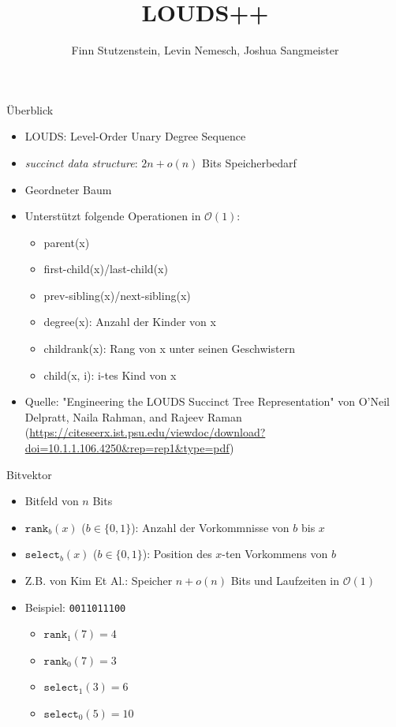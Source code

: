 \documentclass[ngerman,aspectratio=169,10pt]{beamer}
\title{LOUDS++}
\author{Finn Stutzenstein, Levin Nemesch, Joshua Sangmeister}
\institute{Algorithm Engineering - Übung 2}
\begin{document}
	
\maketitle

\begin{frame}{Überblick}
    \begin{itemize}
        \item LOUDS: Level-Order Unary Degree Sequence
        \item \emph{succinct data structure}: $2n + o(n)$ Bits Speicherbedarf
        \item Geordneter Baum
        \item Unterstützt folgende Operationen in $\mathcal{O}(1)$:
        \begin{itemize}
            \item parent(x)
            \item first-child(x)/last-child(x)
            \item prev-sibling(x)/next-sibling(x)
            \item degree(x): Anzahl der Kinder von x
            \item childrank(x): Rang von x unter seinen Geschwistern
            \item child(x, i): i-tes Kind von x
        \end{itemize}
    	\item Quelle: "Engineering the LOUDS Succinct Tree Representation" von O'Neil Delpratt, Naila Rahman, and Rajeev Raman (\url{https://citeseerx.ist.psu.edu/viewdoc/download?doi=10.1.1.106.4250&rep=rep1&type=pdf})
    \end{itemize}
\end{frame}

\begin{frame}{Bitvektor}
    \begin{itemize}
        \item<1-> Bitfeld von $n$ Bits
        \item<1-> $\texttt{rank}_b(x)$ ($b\in\{0,1\}$): Anzahl der Vorkommnisse von $b$ bis $x$
        \item<1-> $\texttt{select}_b(x)$ ($b\in\{0,1\}$): Position des $x$-ten Vorkommens von $b$
        \item<1-> Z.B. von Kim Et Al.: Speicher $n+o(n)$ Bits und Laufzeiten in $\mathcal{O}(1)$
        \item<2-> Beispiel: \texttt{0011011100}
            \begin{itemize}
                \item $\texttt{rank}_1(7)=4$
                \item $\texttt{rank}_0(7)=3$
                \item $\texttt{select}_1(3)=6$
                \item $\texttt{select}_0(5)=10$
            \end{itemize}
    \end{itemize}
\end{frame}
\end{document}
